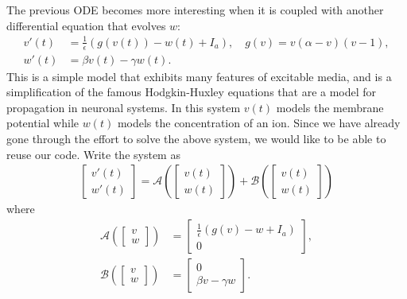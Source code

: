 \documentclass[12pt]{report}
\begin{document}
\newpage



\begin{problem}
    The previous ODE becomes more interesting when it is coupled with another differential equation that evolves $w$:
\begin{align*} v'(t) &= \frac 1 \epsilon \left( g(v(t)) - w(t) + I_a \right), \quad g(v) = v (\alpha - v) (v-1),\\
w'(t) &= \beta v(t) - \gamma w(t).\end{align*}
This is a simple model that exhibits many features of excitable media, and is a simplification of the famous Hodgkin-Huxley equations that are a model for propagation in neuronal systems.  In this system $v(t)$ models the membrane potential while $w(t)$ models the concentration of an ion.
Since we have already gone through the effort to solve the above system, we would like to be able to reuse our code.  Write the system as
\begin{align*}
\begin{bmatrix} v'(t) \\ w'(t) \end{bmatrix} = \mathcal A\left(\begin{bmatrix} v(t) \\ w(t) \end{bmatrix} \right) + \mathcal B\left(\begin{bmatrix} v(t) \\ w(t) \end{bmatrix} \right)
\end{align*}
where
\begin{align*}
\mathcal A \left(\begin{bmatrix} v \\ w \end{bmatrix} \right) &= \begin{bmatrix} \frac 1 \epsilon \left( g(v) - w+ I_a \right) \\ 0\end{bmatrix}, \\
\mathcal B \left(\begin{bmatrix} v \\ w \end{bmatrix} \right) &= \begin{bmatrix} 0 \\ \beta v - \gamma w\end{bmatrix}.

\end{align*}
\end{problem}
\end{document}
